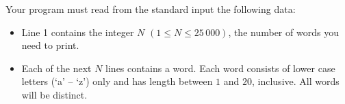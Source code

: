 Your program must read from the standard input the following data:
\begin{itemize}
\item Line 1 contains the integer $N$ $(1 \leqslant N \leqslant 25\,000)$, the number of words you need to print.
\item Each of the next $N$ lines contains a word. Each word consists of lower case letters (`a' -- `z') only and has length between $1$ and $20$, inclusive. All words will be distinct.
\end{itemize}